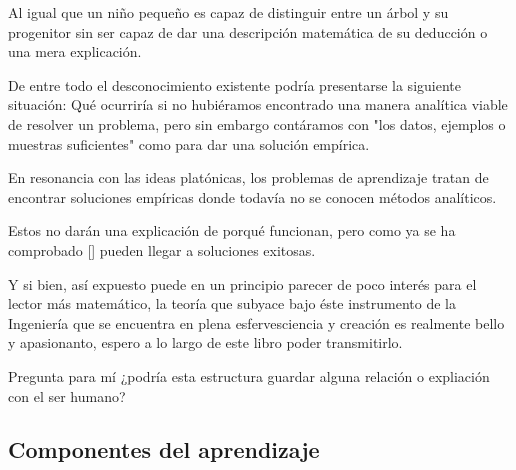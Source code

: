 Al igual que un niño pequeño es capaz de distinguir entre un árbol y su progenitor sin ser
capaz de dar una descripción matemática de su deducción o una mera explicación.

De entre todo el desconocimiento existente podría presentarse la siguiente situación: 
Qué ocurriría si no hubiéramos encontrado una manera analítica viable de resolver un problema,
pero sin embargo 
contáramos con "los datos, ejemplos o muestras suficientes" como para dar una solución empírica. 


En resonancia con las ideas platónicas, los problemas de aprendizaje tratan de encontrar soluciones empíricas donde todavía 
no se conocen métodos analíticos. 

Estos no darán una explicación de porqué funcionan, pero como ya se ha comprobado [] pueden llegar a 
soluciones exitosas. 

Y si bien, así expuesto puede en un principio parecer de poco interés para el lector más matemático, 
la teoría que subyace bajo éste instrumento de la Ingeniería que se encuentra en plena esfervesciencia y  creación 
es realmente bello y apasionanto, espero a lo largo de este libro poder transmitirlo. 

Pregunta para mí ¿podría esta estructura guardar alguna relación o expliación con el ser humano?
 
\subsection{Componentes del aprendizaje}  

\endinput